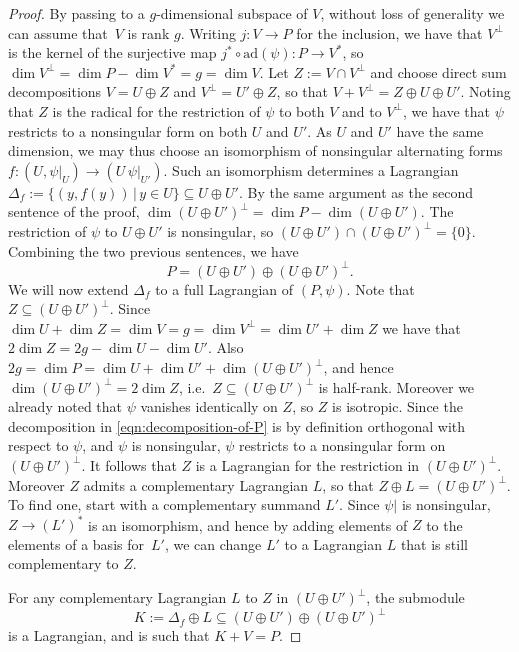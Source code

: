\documentclass[a4paper, reqno]{amsart}
\theoremstyle{definition}
\theoremstyle{remark}
\begin{document}
\begin{proof}
By passing to a $g$-dimensional subspace of $V$, without loss of generality we can assume that~$V$ is rank $g$. Writing $j\colon V\to P$ for the inclusion, we have that $V^\perp$ is the kernel of the surjective map $j^*\circ \mathrm{ad}(\psi)\colon P\to V^*$, so  $\dim V^\perp=\dim P-\dim V^*=g = \dim V$. Let $Z:=V\cap V^\perp$ and choose direct sum decompositions $V=U\oplus Z$ and $V^\perp=U'\oplus Z$, so that $V+V^\perp=Z\oplus U\oplus U'$. Noting that $Z$ is the radical for the restriction of $\psi$ to both $V$ and to $V^\perp$, we have that $\psi$ restricts to a nonsingular form on both $U$ and $U'$. As $U$ and $U'$ have the same dimension, we may thus choose an isomorphism of nonsingular alternating forms $f\colon (U,\psi|_U)\to (U\,\psi|_{U'})$. Such an isomorphism determines a Lagrangian $\Delta_f:=\{(y,f(y))\,|\,y\in U\}\subseteq U\oplus U'$.  By the same argument as the second sentence of the proof, $\dim(U \oplus U')^{\perp} = \dim P - \dim(U \oplus U')$. 
The restriction of $\psi$ to $U\oplus U'$ is nonsingular, so $(U\oplus U')\cap (U\oplus U')^\perp=\{0\}$. Combining the two previous sentences, we have 
\begin{equation}\label{eqn:decomposition-of-P}
P=(U\oplus U')\oplus (U\oplus U')^\perp.
\end{equation}
We will now extend $\Delta_f$ to a full Lagrangian of $(P,\psi)$. Note that $Z\subseteq (U\oplus U')^\perp$. 
Since $\dim U + \dim Z = \dim V = g = \dim V^{\perp} = \dim U' + \dim Z$ we have that $2 \dim Z = 2g-\dim U - \dim U'$. Also $2g = \dim P = \dim U + \dim U' + \dim (U\oplus U')^{\perp}$, and hence $\dim (U\oplus U')^{\perp} = 2 \dim Z$, i.e.\ $Z\subseteq (U\oplus U')^\perp$ is half-rank.  Moreover we already noted that $\psi$ vanishes identically on $Z$, so $Z$ is isotropic.  
Since the decomposition in \eqref{eqn:decomposition-of-P} is by definition orthogonal with respect to $\psi$, and $\psi$ is nonsingular, $\psi$ restricts to a nonsingular form on $(U\oplus U')^\perp$.  It follows that $Z$ is a Lagrangian for the restriction in $(U\oplus U')^\perp$. Moreover $Z$ admits a complementary Lagrangian $L$,  so that $Z\oplus L= (U\oplus U')^\perp$.  
To find one,  start with a complementary summand $L'$. Since $\psi|$ is nonsingular, $Z \to (L')^*$ is an isomorphism, and hence by adding elements of $Z$ to the elements of a basis for~$L'$, we can change $L'$ to a Lagrangian $L$ that is still complementary to $Z$. 

For any complementary Lagrangian $L$ to $Z$ in $(U\oplus U')^\perp$, the submodule
\[
K:=\Delta_f\oplus L\subseteq (U\oplus U')\oplus (U\oplus U')^\perp
\]
is a Lagrangian, and is such that $K+V=P$.
\end{proof}
\end{document}
